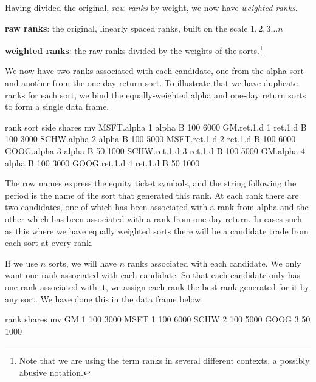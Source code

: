 \documentclass{article}
\begin{document}
Having divided the original, \emph{raw ranks} by weight, we now have
\emph{weighted ranks}.

\begin{description}

\item{\bf{raw ranks}}: the original, linearly spaced ranks, built on
  the scale $1, 2, 3\dots{}n$

\item{\bf{weighted ranks}}: the raw ranks divided by the weights of
  the sorts.\protect\footnote{Note that we are using the term ranks in
  several different contexts, a possibly abusive notation.}

\end{description}

We now have two ranks associated with each candidate, one from the
alpha sort and another from the one-day return sort.  To illustrate
that we have duplicate ranks for each sort, we bind the
equally-weighted alpha and one-day return sorts to form a single data
frame.

\begin{Schunk}
\begin{Soutput}
             rank    sort side shares   mv
MSFT.alpha      1   alpha    B    100 6000
GM.ret.1.d      1 ret.1.d    B    100 3000
SCHW.alpha      2   alpha    B    100 5000
MSFT.ret.1.d    2 ret.1.d    B    100 6000
GOOG.alpha      3   alpha    B     50 1000
SCHW.ret.1.d    3 ret.1.d    B    100 5000
GM.alpha        4   alpha    B    100 3000
GOOG.ret.1.d    4 ret.1.d    B     50 1000
\end{Soutput}
\end{Schunk}

The row names express the equity ticket symbols, and the string
following the period is the name of the sort that generated this rank.
At each rank there are two candidates, one of which has been
associated with a rank from alpha and the other which has been
associated with a rank from one-day return.  In cases such as this
where we have equally weighted sorts there will be a candidate trade
from each sort at every rank.

If we use $n$ sorts, we will have $n$ ranks associated with each
candidate.  We only want one rank associated with each candidate.  So
that each candidate only has one rank associated with it, we assign
each rank the best rank generated for it by any sort.  We have done
this in the data frame below.


\begin{Schunk}
\begin{Soutput}
     rank shares   mv
GM      1    100 3000
MSFT    1    100 6000
SCHW    2    100 5000
GOOG    3     50 1000
\end{Soutput}
\end{Schunk}
\end{document}
